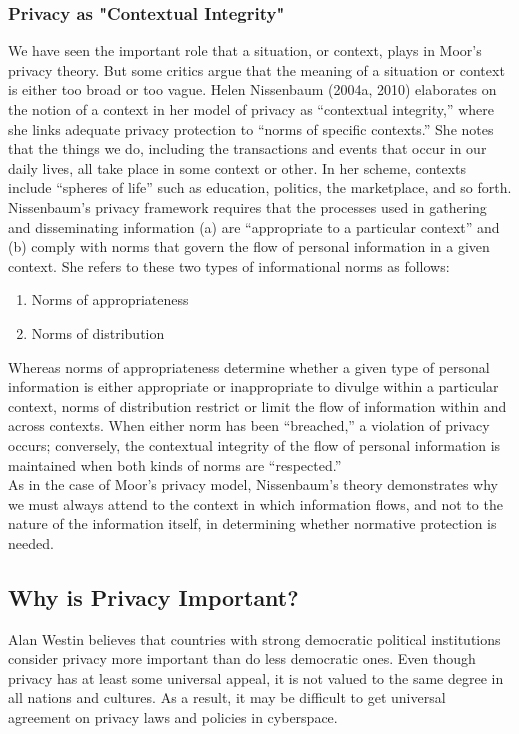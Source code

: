 \documentclass[12pt]{article}
\theoremstyle{definition}
\begin{document}
\subsubsection{Privacy as "Contextual Integrity"}
We have seen the important role that a situation, or context, plays in Moor’s privacy theory. But some critics argue that the meaning of a situation or context is either too broad or too vague. Helen Nissenbaum (2004a, 2010) elaborates on the notion of a context in her model of privacy as “contextual integrity,” where she links adequate privacy protection to “norms of specific contexts.” She notes that the things we do, including the transactions and events that occur in our daily lives, all take place in some context or other. In her scheme, contexts include “spheres of life” such as education, politics, the marketplace, and so forth.\\
Nissenbaum’s privacy framework requires that the processes used in gathering and disseminating information (a) are “appropriate to a particular context” and (b) comply with norms that govern the flow of personal information in a given context. She refers to these two types of informational norms as follows:
\begin{enumerate}
\item Norms of appropriateness
\item Norms of distribution
\end{enumerate}
Whereas norms of appropriateness determine whether a given type of personal information is either appropriate or inappropriate to divulge within a particular context, norms of distribution restrict or limit the flow of information within and across contexts. When either norm has been “breached,” a violation of privacy occurs; conversely, the contextual integrity of the flow of personal information is maintained when both kinds of norms are “respected.”\\
As in the case of Moor’s privacy model, Nissenbaum’s theory demonstrates why we
must always attend to the context in which information flows, and not to the nature of
the information itself, in determining whether normative protection is needed.
\subsection{Why is Privacy Important?}
Alan Westin believes that countries with strong democratic political institutions consider privacy more important than do less democratic ones. Even though privacy has at least some universal appeal, it is not valued to the same degree in all nations and cultures. As a result, it may be difficult to get universal agreement on privacy laws and policies in cyberspace.
\end{document}
